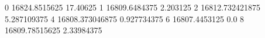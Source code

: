 0 16824.8515625 17.40625
1 16809.6484375 2.203125
2 16812.732421875 5.287109375
4 16808.373046875 0.927734375
6 16807.4453125 0.0
8 16809.78515625 2.33984375
